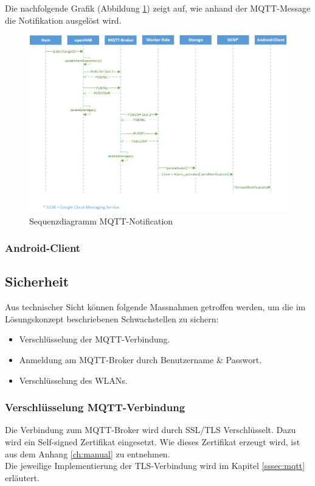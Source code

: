 Die nachfolgende Grafik (Abbildung \ref{fig:sequenzNotification}) zeigt auf, wie anhand der MQTT-Message die Notifikation ausgelöst wird.

\begin{figure}[H]
	\centering
		\includegraphics[scale=0.65]{report/img/sequenzDiagramNotification}
	\caption{Sequenzdiagramm MQTT-Notification}
	\label{fig:sequenzNotification}
\end{figure}

\subsubsection{Android-Client}


\subsection{Sicherheit}
Aus technischer Sicht können folgende Massnahmen getroffen werden, um die im Lösungskonzept beschriebenen Schwachstellen zu sichern:
\begin{itemize}
	\item Verschlüsselung der MQTT-Verbindung.
	\item Anmeldung am MQTT-Broker durch Benutzername \& Passwort.
	\item Verschlüsselung des WLANs.
\end{itemize}

\subsubsection{Verschlüsselung MQTT-Verbindung}
Die Verbindung zum MQTT-Broker wird durch SSL/TLS Verschlüsselt. Dazu wird ein Self-signed Zertifikat eingesetzt. Wie dieses Zertifikat erzeugt wird, ist aus dem Anhang \ref{ch:manual} zu entnehmen. \\
Die jeweilige Implementierung der TLS-Verbindung wird im Kapitel \ref{sssec:mqtt} erläutert.

